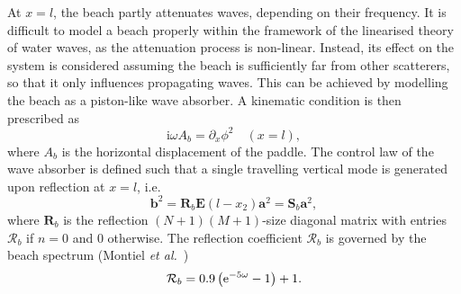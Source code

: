 \documentclass[12pt,a4paper]{article}
\def\ci{{\mathrm i}}
\renewcommand{\exp}{{\rm e}}
\newcommand{\ie}{i.e.\ }
\newcommand{\etal}{\textit{et al.}\ }
\newcommand{\vp}{{\phi}}
\begin{document}
At $x=l$, the beach partly attenuates waves, depending on their frequency. It is difficult to model a beach 
properly within the framework of the linearised theory of water waves, as the attenuation process is 
non-linear. Instead, its effect on the system is considered assuming the beach is sufficiently far from 
other scatterers, so that it only influences propagating waves. This can be achieved by modelling the beach 
as a piston-like wave absorber. A kinematic condition is then prescribed as
\begin{equation}
  \label{eq:beach}
  \ci \omega A_b = \partial_x \vp^2 \quad (x=l),
\end{equation}
where $A_b$ is the horizontal displacement of the paddle. The control law of the wave absorber is defined 
such that a single travelling vertical mode is generated upon reflection at $x=l$, \ie
\begin{equation}
  \mathbf{b}^2 = \mathbf{R}_b\mathbf{E}(l-x_2)\mathbf{a}^2 = \mathbf{S}_b\mathbf{a}^2,
\end{equation}
where $\mathbf{R}_b$ is the reflection $(N+1)(M+1)$-size diagonal matrix with entries $\mathcal{R}_b$ if 
$n=0$ and $0$ otherwise. The reflection coefficient $\mathcal{R}_b$ is governed by the beach spectrum 
(Montiel \etal \cite{Montiel_etal12})
\begin{equation}
  \mathcal{R}_b = 0.9\left(\exp^{-5\omega} -1\right) + 1.
\end{equation}






% 


%
\end{document}
